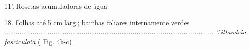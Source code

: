 \begin{customList1}
\begin{customList1}
\begin{customList1}
\begin{customList1}
\begin{customList1}
\begin{customList1}
\begin{customList1}
\end{customList1}

\end{customList1}

\end{customList1}

\end{customList1}

\item \par{}11'.\allowbreak{} Rosetas acumuladoras de água
\begin{customList1}
\item \par{}18.\allowbreak{} Folhas até 5 cm larg.\allowbreak{}; bainhas foliares internamente verdes .\allowbreak{}.\allowbreak{}.\allowbreak{}.\allowbreak{}.\allowbreak{}.\allowbreak{}.\allowbreak{}.\allowbreak{}.\allowbreak{}.\allowbreak{}.\allowbreak{}.\allowbreak{}.\allowbreak{}.\allowbreak{}.\allowbreak{}.\allowbreak{}.\allowbreak{}.\allowbreak{}.\allowbreak{}.\allowbreak{}.\allowbreak{}.\allowbreak{}.\allowbreak{}.\allowbreak{}.\allowbreak{}.\allowbreak{}.\allowbreak{}.\allowbreak{}.\allowbreak{}.\allowbreak{}.\allowbreak{}.\allowbreak{}.\allowbreak{}.\allowbreak{}.\allowbreak{}.\allowbreak{}.\allowbreak{}.\allowbreak{}.\allowbreak{}.\allowbreak{}.\allowbreak{}.\allowbreak{}.\allowbreak{}.\allowbreak{}.\allowbreak{}.\allowbreak{}.\allowbreak{}.\allowbreak{}.\allowbreak{}.\allowbreak{}.\allowbreak{}.\allowbreak{}.\allowbreak{}.\allowbreak{}.\allowbreak{}.\allowbreak{}.\allowbreak{}.\allowbreak{}.\allowbreak{}.\allowbreak{}.\allowbreak{}.\allowbreak{}.\allowbreak{}.\allowbreak{}.\allowbreak{}.\allowbreak{}.\allowbreak{}.\allowbreak{}.\allowbreak{}.\allowbreak{}.\allowbreak{}.\allowbreak{}.\allowbreak{}.\allowbreak{}.\allowbreak{}.\allowbreak{}.\allowbreak{}.\allowbreak{}.\allowbreak{}.\allowbreak{}.\allowbreak{}.\allowbreak{}.\allowbreak{}.\allowbreak{}.\allowbreak{}.\allowbreak{}.\allowbreak{}.\allowbreak{}.\allowbreak{}.\allowbreak{}.\allowbreak{}.\allowbreak{}.\allowbreak{}.\allowbreak{}.\allowbreak{}.\allowbreak{}.\allowbreak{}.\allowbreak{}.\allowbreak{}.\allowbreak{}.\allowbreak{}.\allowbreak{}.\allowbreak{}.\allowbreak{}.\allowbreak{}.\allowbreak{}.\allowbreak{}.\allowbreak{}.\allowbreak{}.\allowbreak{}.\allowbreak{} \textit{Tillandsia fasciculata} (\allowbreak{} Fig.\allowbreak{} 4b-\allowbreak{}c)\allowbreak{}

\end{customList1}
\end{customList1}
\end{customList1}
\end{customList1}
